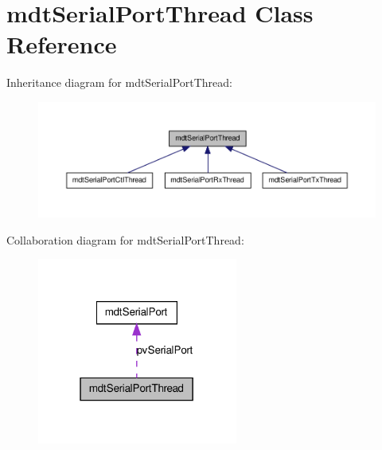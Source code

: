 \hypertarget{classmdt_serial_port_thread}{
\section{mdtSerialPortThread Class Reference}
\label{classmdt_serial_port_thread}
}


Inheritance diagram for mdtSerialPortThread:\nopagebreak
\begin{figure}[H]
\begin{center}
\leavevmode
\includegraphics[width=400pt]{classmdt_serial_port_thread__inherit__graph}
\end{center}
\end{figure}


Collaboration diagram for mdtSerialPortThread:\nopagebreak
\begin{figure}[H]
\begin{center}
\leavevmode
\includegraphics[width=187pt]{classmdt_serial_port_thread__coll__graph}
\end{center}
\end{figure}

